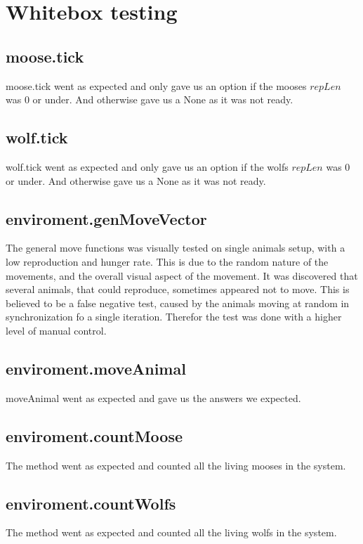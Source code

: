 \documentclass{article}
\begin{document}
         
\section{Whitebox testing}
    \subsection{moose.tick}
    moose.tick went as expected and only gave us an option if the mooses $repLen$ was 0 or under. And otherwise gave us a None as it was not ready.
    
    \subsection{wolf.tick}
    wolf.tick went as expected and only gave us an option if the wolfs $repLen$ was 0 or under. And otherwise gave us a None as it was not ready.
    
    \subsection{enviroment.genMoveVector}
    The general move functions was visually tested on single animals setup, with a low reproduction and hunger rate. This is due to the random nature of the movements, and the overall visual aspect of the movement. It was discovered that several animals, that could reproduce, sometimes appeared not to move. This is believed to be a false negative test, caused by the animals moving at random in synchronization fo a single iteration. Therefor the test was done with a higher level of manual control. \newline
    
    \subsection{enviroment.moveAnimal}
    moveAnimal went as expected and gave us the answers we expected.
    
    \subsection{enviroment.countMoose}
    The method went as expected and counted all the living mooses in the system.
    
    \subsection{enviroment.countWolfs}
    The method went as expected and counted all the living wolfs in the system.
    
\end{document}
